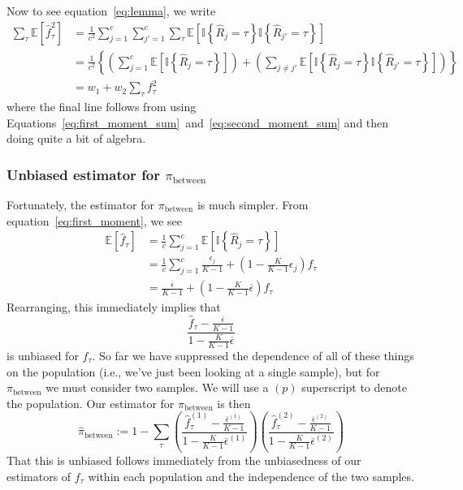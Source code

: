 \documentclass[letterpaper,fontsize=9pt,DIV=12]{scrartcl}
\newcommand*{\pib}{$\pi_\text{between}$\xspace}
\begin{document}
Now to see equation~\eqref{eq:lemma}, we write
\begin{align*}
\sum_\tau\mathbb{E}\left[\hat{f}_\tau^2\right] &= \frac{1}{c^2}\sum_{j=1}^c \sum_{j'=1}^c \sum_\tau \mathbb{E}\left[\mathbb{I}\left\{\hat{R}_j=\tau\right\}\mathbb{I}\left\{\hat{R}_{j'}=\tau\right\}\right]\\
&= \frac{1}{c^2}\left\{\left(\sum_{j=1}^c \mathbb{E}\left[\mathbb{I}\left\{\hat{R}_j=\tau\right\}\right]\right) + \left( \sum_{j\ne j'}\mathbb{E}\left[\mathbb{I}\left\{\hat{R}_j=\tau\right\}\mathbb{I}\left\{\hat{R}_{j'}=\tau\right\}\right] \right) \right\}\\
&= w_1 + w_2\sum_\tau f_\tau^2
\end{align*}
where the final line follows from using Equations~\eqref{eq:first_moment_sum}~and~\eqref{eq:second_moment_sum} and then doing quite a bit of algebra.


\subsubsection*{Unbiased estimator for \pib}
\label{supp:sec:FST:sub:HeterozygositySequencingError:sub:UnbiasedPIB}

Fortunately, the estimator for \pib is much simpler.  From equation~\eqref{eq:first_moment}, we see
\begin{align*}
\mathbb{E}\left[\hat{f}_\tau\right] &= \frac{1}{c}\sum_{j=1}^c \mathbb{E}\left[\mathbb{I}\left\{\hat{R}_j = \tau\right\}\right]\\
&= \frac{1}{c}\sum_{j=1}^c \frac{\epsilon_j}{K-1} + \left(1 - \frac{K}{K-1}\epsilon_j\right)f_\tau\\
&= \frac{\overline{\epsilon}}{K-1} + \left(1 - \frac{K}{K-1}\overline{\epsilon}\right)f_\tau
\end{align*}
Rearranging, this immediately implies that
\[
\frac{\hat{f}_\tau - \frac{\overline{\epsilon}}{K-1}}{1 - \frac{K}{K-1}\overline{\epsilon}}
\]
is unbiased for $f_\tau$.  So far we have suppressed the dependence of all of these things on the population (i.e., we've just been looking at a single sample), but for \pib we must consider two samples.  We will use a $(p)$ superscript to denote the population.  Our estimator for \pib is then
\[
\widehat{\pi}_\text{between} := 1 - \sum_\tau \left(\frac{\hat{f}^{(1)}_\tau - \frac{\overline{\epsilon}^{(1)}}{K-1}}{1 - \frac{K}{K-1}\overline{\epsilon}^{(1)}}\right)\left(\frac{\hat{f}^{(2)}_\tau - \frac{\overline{\epsilon}^{(2)}}{K-1}}{1 - \frac{K}{K-1}\overline{\epsilon}^{(2)}}\right)
\]
That this is unbiased follows immediately from the unbiasedness of our estimators of $f_\tau$ within each population and the independence of the two samples. 
\end{document}
